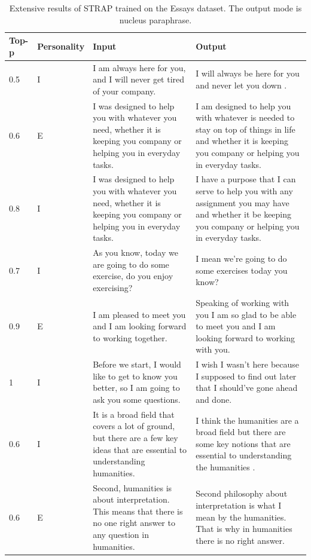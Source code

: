 \documentclass[nomenclature, english, biblatex]{kththesis}
\begin{document}
\begin{table}
    \centering
    \begin{adjustbox}{max width=\textwidth}
        \begin{tabular}{|p{}|p{}|p{}|p{}|}
        \hline
        Top-p & Personality & Input & Output \\
        \hline
        \hline
        0.5 & I & I am always here for you, and I will never get tired of your company. & I will always be here for you and never let you down .\\
        \hline
        0.6 & E & I was designed to help you with whatever you need, whether it is keeping you company or helping you in everyday tasks. & I am designed to help you with whatever is needed to stay on top of things in life and whether it is keeping you company or helping you in everyday tasks. \\
        \hline
        0.8 & I & I was designed to help you with whatever you need, whether it is keeping you company or helping you in everyday tasks. & I have a purpose that I can serve to help you with any assignment you may have and whether it be keeping you company or helping you in everyday tasks.\\
        \hline
        0.7 & I & As you know, today we are going to do some exercise, do you enjoy exercising? & I mean we're going to do some exercises today you know?\\
        \hline
        0.9 & E & I am pleased to meet you and I am looking forward to working together. & Speaking of working with you I am so glad to be able to meet you and I am looking forward to working with you.\\
        \hline
        1 & I & Before we start, I would like to get to know you better, so I am going to ask you some questions. & I wish I wasn't here because I supposed to find out later that I should've gone ahead and done.\\
        \hline
        0.6 & I & It is a broad field that covers a lot of ground, but there are a few key ideas that are essential to understanding humanities. & I think the humanities are a broad field but there are some key notions that are essential to understanding the humanities .\\
        \hline
        0.6 & E & Second, humanities is about interpretation. This means that there is no one right answer to any question in humanities. & Second philosophy about interpretation is what I mean by the humanities. That is why in humanities there is no right answer.\\
        \hline
        \end{tabular}
    \end{adjustbox}
    \caption{Extensive results of STRAP trained on the Essays dataset. The output mode is nucleus paraphrase.}
    \label{tab:strap_np_essays_extensive}
\end{table}
\end{document}
